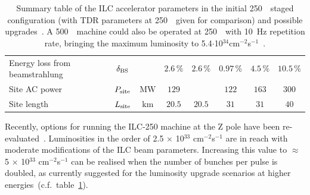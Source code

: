 \begin{table}[tbhp]
\begin{adjustbox}{width=1.\textwidth,center=\textwidth}
\begin{tabular}{lccccccc}
Energy loss from beamstrahlung  & $\delta_{\mathrm{BS}}$ &  & $2.6\,\%$  & $2.6\,\%$  & $0.97\,\%$  & $4.5\,\%$ & $10.5\,\%$ \\
Site AC power  & $P_{\mathrm{{site}}}$ &  ${\mathrm{MW}}$ & $129$ & & $122$ & $163$ & $300$ \\
Site length & $L_{\mathrm{{site}}}$ &  ${\mathrm{km}}$ & $20.5$ & $20.5$ & $31$ & $31$ & $40$ \\
\end{tabular}
\caption{Summary table of the ILC accelerator parameters in the initial 250~\GeV~staged configuration (with TDR parameters at 250~\GeV~given for comparison) and possible upgrades~\cite{Bambade:2019fyw}. A 500~\GeV~machine could also be operated at 250~\GeV~with 10~Hz repetition rate, bringing the maximum luminosity to 5.4$\cdot$10$^{34}$cm$^{-2}$s$^{-1}$~\cite{Harrison:2013nva}.
\label{tab:ilc-params}}
\end{adjustbox}
\end{table}

Recently, options for running the ILC-250 machine at the Z pole have been re-evaluated~\cite{Yokoya:2019rhx}. Luminosities in the order of 2.5 $\times$ 10$^{33}$ cm$^{-2}$s$^{-1}$ are in reach with moderate modifications of the ILC beam parameters. Increasing this value to $\approx$ 5 $\times$ 10$^{33}$ cm$^{-2}$s$^{-1}$ can be realised when the number of bunches per pulse is doubled, as currently suggested for the luminosity upgrade scenarios at higher energies~(c.f.~table~\ref{tab:ilc-params}).

